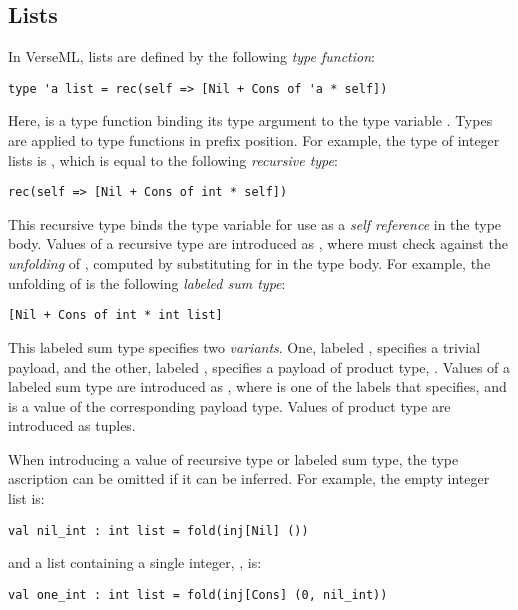 \subsection{Lists}\label{sec:lists}
In VerseML, lists are defined by the following \emph{type function}:
\begin{lstlisting}[numbers=none]
type 'a list = rec(self => [Nil + Cons of 'a * self])
\end{lstlisting}
Here,  is a {type function} binding its type argument to the type variable . Types are applied to type functions in prefix position. For example, the type of integer lists is , which is equal to the following \emph{recursive type}:
\begin{lstlisting}[numbers=none]
rec(self => [Nil + Cons of int * self])
\end{lstlisting}
This {recursive type} binds the type variable  for use as a \emph{self reference} in the type body. Values of a recursive type  are introduced as , where   must check against the \emph{unfolding} of , computed by substituting  for  in the type body. For example, the unfolding of  is the following \emph{labeled sum type}:
\begin{lstlisting}[numbers=none]
[Nil + Cons of int * int list]
\end{lstlisting}
This {labeled sum type} specifies two \emph{variants}. One, labeled , specifies a trivial payload, and the other, labeled , specifies a payload of product type, . Values of a labeled sum type  are introduced as , where  is one of the labels that  specifies, and  is a value of the corresponding payload type. Values of product type are introduced as tuples.

When introducing a value of recursive type or labeled sum type, the type ascription can be omitted if it can be inferred. For example, the empty integer list is:
\begin{lstlisting}[numbers=none]
val nil_int : int list = fold(inj[Nil] ())
\end{lstlisting}
and a list containing a single integer, , is:
\begin{lstlisting}[numbers=none]
val one_int : int list = fold(inj[Cons] (0, nil_int))
\end{lstlisting}


